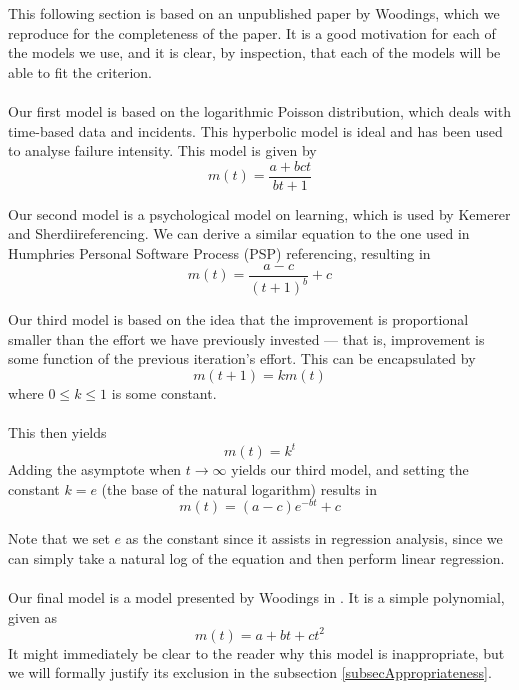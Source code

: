 This following section is based on an unpublished paper by Woodings, which we
reproduce for the completeness of the paper.
It is a good motivation for each of the models we use, and it is clear, by
inspection, that each of the models will be able to fit the criterion.\\
\\
Our first model is based on the logarithmic Poisson distribution, which
deals with time-based data and incidents.
This hyperbolic model is ideal and has been used to analyse failure intensity.
This model is given by
\begin{equation} \label{modelOne}
  m(t) = \frac{a+bct}{bt+1}
\end{equation}

Our second model is a psychological model on learning, which is used by Kemerer
and Sherdii\FIXME referencing.
We can derive a similar equation to the one used in Humphries Personal Software
Process (PSP) \FIXME referencing, resulting in
\begin{equation} \label{modelTwo}
  m(t) = \frac{a-c}{(t+1)^{b}}+c
\end{equation}

Our third model is based on the idea that the improvement is proportional
smaller than
the effort we have previously invested --- that is, improvement is some function of the
previous iteration's effort.
This can be encapsulated by 
\[
  m(t+1) = k m(t)
\]
where $0 \leq k \leq 1$ is some constant.\\
\\
This then yields
\[
  m(t) = k^t 
\]
Adding the asymptote when $t \to \infty$ yields our third model, and setting the
constant $k = e$ (the base of the natural logarithm) results in
\begin{equation} \label{modelThree}
  m(t) = (a-c) e^{-bt} + c
\end{equation}

Note that we set $e$ as the constant since it assists in regression analysis,
since we can simply take a natural log of the equation and then perform linear
regression.\\
\\
Our final model is a model presented by Woodings in \FIXME.
It is a simple polynomial, given as
\begin{equation} \label{modelFour}
  m(t) = a + bt + ct^2
\end{equation}
It might immediately be clear to the reader why this model is inappropriate, but
we will formally justify its exclusion in the subsection \ref{subsecAppropriateness}.

